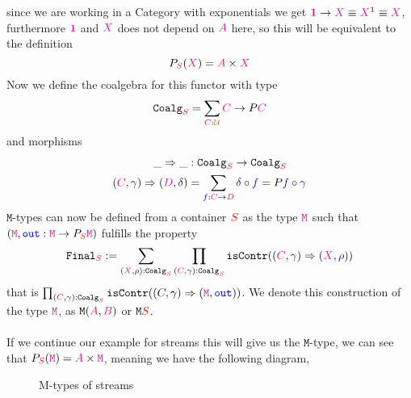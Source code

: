 \documentclass[twoside,11pt,openright]{report}
\newcommand*{\term}[1]{\textcolor{blue!80!black}{#1}}
\newcommand*{\type}[1]{\textcolor{magenta!90!black}{#1}}
\newcommand*{\container}[1]{\textcolor{red}{#1}}
\newcommand*{\universe}[1]{\textcolor{orange!80!black}{#1}}
\newcommand*{\unit}{\type{\textbf{1}}}
\begin{document}
since we are working in a Category with exponentials we get \(\unit \rightarrow \type{X} \equiv \type{X}^{\unit} \equiv \type{X}\), furthermore \(\unit\) and \(\type{X}\) does not depend on \(\type{A}\) here, so this will be equivalent to the definition
\begin{equation}
  P_{\container{S}}(\type{X}) = \type{A} \times \type{X}
\end{equation}
Now we define the coalgebra for this functor with type
\begin{equation}
  \mathtt{Coalg}_{\container{S}} = \sum_{\type{C} : \universe{\mathcal{U}}} \type{C} \rightarrow P\type{C}
\end{equation}
and morphisms
\begin{equation}
  \begin{aligned}
    \_\Rightarrow\_ &: \mathtt{Coalg}_{\container{S}} \rightarrow \mathtt{Coalg}_{\container{S}} \\
    (\type{C},\term{\gamma}) \Rightarrow (\type{D},\term{\delta}) &= \sum_{\term{f} : \type{C} \rightarrow \type{D}} \term{\delta} \circ \term{f} = P \term{f} \circ \term{\gamma}
  \end{aligned}
\end{equation}
\(\mathtt{M}\)-types can now be defined from a container \(\container{S}\) as the type \(\type{\mathtt{M}}\) such that \((\type{\mathtt{M}},\term{\mathtt{out}} : \type{\mathtt{M}} \rightarrow P_{\container{S}}\type{\mathtt{M}})\) fulfills the property
\begin{equation}
  \mathtt{Final}_{\container{S}} := \sum_{(\type{X},\term{\rho}) : \mathtt{Coalg}_{\container{S}}} \prod_{{(\type{C},\term{\term{\gamma}}) : \mathtt{Coalg}_{\container{S}}}} \mathtt{isContr}((\type{C},\term{\gamma}) \Rightarrow (\type{X},\term{\rho}))
\end{equation}
that is \(\prod_{(\type{C},\term{\gamma}) : \mathtt{Coalg}_{\container{S}}} \mathtt{isContr}((C,\gamma) \Rightarrow (\type{\mathtt{M}},\term{\mathtt{out}}))\). We denote this construction of the type \(\type{\texttt{M}}\), as \(\texttt{M}(\type{A},\type{B})\) or \(\texttt{M}\container{S}\).
\\ \\
If we continue our example for streams this will give us the \(\mathtt{M}\)-type, we can see that \(P_{\container{S}}(\type{\mathtt{M}}) = \type{A} \times \type{\mathtt{M}}\), meaning we have the following diagram,
\begin{figure}[h]
  \centering
  \caption{M-types of streams}
\end{figure}
\end{document}
